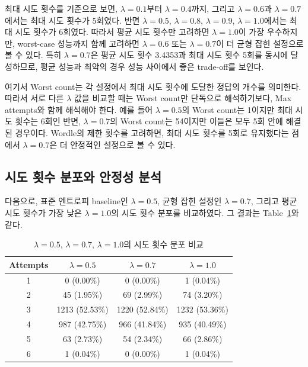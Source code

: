 \documentclass[11pt]{article}
\begin{document}
최대 시도 횟수를 기준으로 보면, $\lambda = 0.1$부터 $\lambda = 0.4$까지,
그리고 $\lambda = 0.6$과 $\lambda = 0.7$에서는 최대 시도 횟수가 5회였다.
반면 $\lambda = 0.5$, $\lambda = 0.8$, $\lambda = 0.9$, $\lambda = 1.0$에서는 최대 시도 횟수가 6회였다.
따라서 평균 시도 횟수만 고려하면 $\lambda = 1.0$이 가장 우수하지만,
worst-case 성능까지 함께 고려하면 $\lambda = 0.6$ 또는 $\lambda = 0.7$이 더 균형 잡힌 설정으로 볼 수 있다.
특히 $\lambda = 0.7$은 평균 시도 횟수 3.4353과 최대 시도 횟수 5회를 동시에 달성하므로,
평균 성능과 최악의 경우 성능 사이에서 좋은 trade-off를 보인다.

여기서 Worst count는 각 설정에서 최대 시도 횟수에 도달한 정답의 개수를 의미한다.
따라서 서로 다른 $\lambda$ 값을 비교할 때는 Worst count만 단독으로 해석하기보다,
Max attempts와 함께 해석해야 한다.
예를 들어 $\lambda = 0.5$의 Worst count는 1이지만 최대 시도 횟수는 6회인 반면,
$\lambda = 0.7$의 Worst count는 54이지만 이들은 모두 5회 안에 해결된 경우이다.
Wordle의 제한 횟수를 고려하면, 최대 시도 횟수를 5회로 유지했다는 점에서 $\lambda = 0.7$은 더 안정적인 설정으로 볼 수 있다.

\subsection{시도 횟수 분포와 안정성 분석}

다음으로, 표준 엔트로피 baseline인 $\lambda = 0.5$,
균형 잡힌 설정인 $\lambda = 0.7$,
그리고 평균 시도 횟수가 가장 낮은 $\lambda = 1.0$의 시도 횟수 분포를 비교하였다.
그 결과는 Table~\ref{tab:attempt-distribution-compare}와 같다.

\begin{table}[H]
\centering
\caption{$\lambda = 0.5$, $\lambda = 0.7$, $\lambda = 1.0$의 시도 횟수 분포 비교}
\label{tab:attempt-distribution-compare}
\begin{tabular}{c c c c}
\toprule
Attempts & $\lambda = 0.5$ & $\lambda = 0.7$ & $\lambda = 1.0$ \\
\midrule
1 & 0 (0.00\%) & 0 (0.00\%) & 1 (0.04\%) \\
2 & 45 (1.95\%) & 69 (2.99\%) & 74 (3.20\%) \\
3 & 1213 (52.53\%) & 1220 (52.84\%) & 1232 (53.36\%) \\
4 & 987 (42.75\%) & 966 (41.84\%) & 935 (40.49\%) \\
5 & 63 (2.73\%) & 54 (2.34\%) & 66 (2.86\%) \\
6 & 1 (0.04\%) & 0 (0.00\%) & 1 (0.04\%) \\
\bottomrule
\end{tabular}
\end{table}
\end{document}
